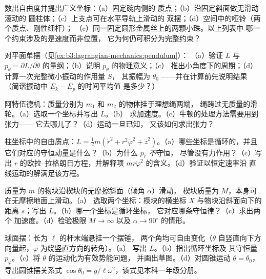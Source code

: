 \begin{exercise}[$\star$]\label{exo:b3:lagrangian-mechanics:1}
数出自由度并提出广义坐标：（a）固定碗内侧的
质点；（b）沿固定斜面做无滑动滚动的
圆柱体；（c）上支点可在水平导轨上滑动的
双摆；（d）空间中的哑铃（两个质点、刚性细杆）；
（e）同一固定圆形金属丝上的两颗小珠。以上列表中
哪一个约束涉及的是速度而非位置，
它为何仍可积分为完整约束？
\end{exercise}

\begin{exercise}[$\star$]\label{exo:b3:lagrangian-mechanics:2}
对平面单摆（见\cref{ex:b3:lagrangian-mechanics:pendulum}）：
（a）验证 $L$ 与 $p_\theta =
\partial L/\partial\dot\theta$ 的量纲；（b）说明 $p_\theta$ 的物理意义；（c）
推出小角度下的周期；（d）计算一次完整微小振动的作用量 $S$，
其振幅为 $\theta_0$ ——并在计算前先说明结果
（简谐振动中 $E_k - E_p$ 的时间平均值
是多少？）
\end{exercise}

\begin{exercise}[$\star$]\label{exo:b3:lagrangian-mechanics:3}
阿特伍德机：质量分别为 $m_1$ 和 $m_2$ 的物体挂于理想绳两端，
绳跨过无质量的滑轮。（a）选取一个坐标并写出 $L$。（b）
求加速度。（c）牛顿的处理方法需要用到张力——
它去哪儿了？（d）运动一旦已知，
又该如何求出张力？
\end{exercise}

\begin{exercise}[$\star$]\label{exo:b3:lagrangian-mechanics:4}
柱坐标中的自由质点：$L = \tfrac12 m(\dot r^2 +
r^2\dot\varphi^2 + \dot z^2)$。（a）哪些坐标是循环的，并且
它们对应的守恒动量是什么？（b）为什么 $p_r$ \emph{不}守恒，
尽管没有力作用？（c）写出
$r$ 的欧拉–拉格朗日方程，并解释项 $mr\dot\varphi^2$ 的含义。（d）验证以恒定速率沿
直线运动的解满足该方程。
\end{exercise}

\begin{exercise}[$\star\star$]\label{exo:b3:lagrangian-mechanics:5}
质量为 $m$ 的物块沿楔块的无摩擦斜面（倾角 $\alpha$）滑动，
楔块质量为 $M$，本身可在无摩擦地面上滑动。（a）
选取两个坐标：楔块的横坐标 $X$ 与物块沿斜面向下的
距离 $s$；写出 $L$。（b）哪一个坐标是循环坐标，
它对应哪条守恒律？（c）求出两个
加速度。（d）检验极限 $M \to \infty$ 以及 $\alpha \to
90^\circ$ 的情形。
\end{exercise}

\begin{exercise}[$\star\star$]\label{exo:b3:lagrangian-mechanics:6}
球面摆：长为 $\ell$ 的杆末端悬挂一个摆锤，
两个角均可自由变化（$\theta$ 自竖直向下方向量起，$\varphi$ 为绕竖直方向的转角）。（a）
写出 $L$。（b）指出循环坐标及
其守恒量 $p_\varphi$。（c）将 $\theta$ 的运动化为有效势能问题，
并画出草图。（d）对圆锥运动 $\theta =
\theta_0$，导出圆锥摆关系式 $\cos\theta_0 =
g/\ell\omega^2$，该式见本科一年级分册。
\end{exercise}

